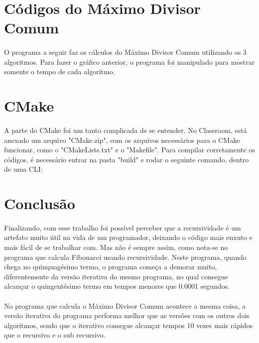 \documentclass{article}
\begin{document}
\section{Códigos do Máximo Divisor Comum}
\paragraph{} O programa a seguir faz os cálculos do Máximo Divisor Comum utilizando os 3 algoritmos. Para fazer o gráfico anterior, o programa foi manipulado para mostrar somente o tempo de cada algoritmo.



\section{CMake}
\paragraph{} A parte do CMake foi um tanto complicada de se entender. No Classroom, está anexado um arquivo "CMake.zip", com os arquivos necessários para o CMake funcionar, como o "CMakeLists.txt" e o "Makefile". Para compilar corretamente os códigos, é necessário entrar na pasta "build" e rodar o seguinte comando, dentro de uma CLI:



\section{Conclusão}
\paragraph{} Finalizando, com esse trabalho foi possível perceber que a recursividade é um artefato muito útil na vida de um programador, deixando o código mais enxuto e mais fácil de se trabalhar com. Mas não é sempre assim, como nota-se no programa que calcula Fibonacci usando recursividade. Neste programa, quando chega no quinquagésimo termo, o programa começa a demorar muito, diferentemente da versão iterativa do mesmo programa, no qual consegue alcançar o quingentésimo termo em tempos menores que 0.0001 segundos. 
\paragraph{} No programa que calcula o Máximo Divisor Comum acontece a mesma coisa, a versão iterativa do programa performa melhor que as versões com os outros dois algoritmos, sendo que o iterativo consegue alcançar tempos 10 vezes mais rápidos que o recursivo e o sub recursivo. 
\end{document}

